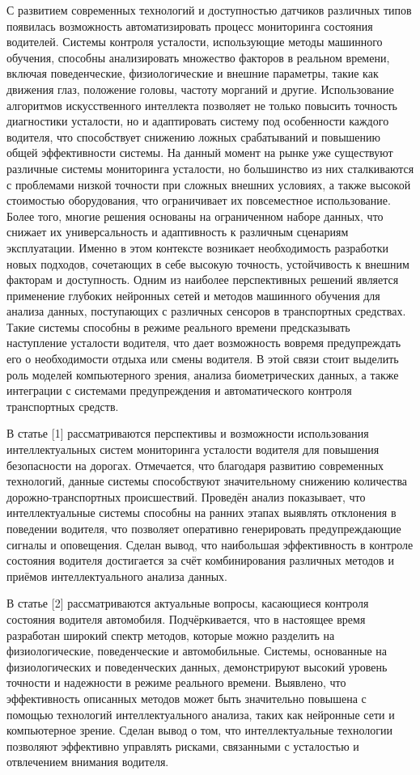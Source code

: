 \documentclass[
]{article}
\begin{document}
С развитием современных технологий и доступностью датчиков различных
типов появилась возможность автоматизировать процесс мониторинга
состояния водителей. Системы контроля усталости, использующие методы
машинного обучения, способны анализировать множество факторов в реальном
времени, включая поведенческие, физиологические и внешние параметры,
такие как движения глаз, положение головы, частоту морганий и другие.
Использование алгоритмов искусственного интеллекта позволяет не только
повысить точность диагностики усталости, но и адаптировать систему под
особенности каждого водителя, что способствует снижению ложных
срабатываний и повышению общей эффективности системы. На данный момент
на рынке уже существуют различные системы мониторинга усталости, но
большинство из них сталкиваются с проблемами низкой точности при сложных
внешних условиях, а также высокой стоимостью оборудования, что
ограничивает их повсеместное использование. Более того, многие решения
основаны на ограниченном наборе данных, что снижает их универсальность и
адаптивность к различным сценариям эксплуатации. Именно в этом контексте
возникает необходимость разработки новых подходов, сочетающих в себе
высокую точность, устойчивость к внешним факторам и доступность. Одним
из наиболее перспективных решений является применение глубоких нейронных
сетей и методов машинного обучения для анализа данных, поступающих с
различных сенсоров в транспортных средствах. Такие системы способны в
режиме реального времени предсказывать наступление усталости водителя,
что дает возможность вовремя предупреждать его о необходимости отдыха
или смены водителя. В этой связи стоит выделить роль моделей
компьютерного зрения, анализа биометрических данных, а также интеграции
с системами предупреждения и автоматического контроля транспортных
средств.

В статье {[}1{]} рассматриваются перспективы и возможности использования
интеллектуальных систем мониторинга усталости водителя для повышения
безопасности на дорогах. Отмечается, что благодаря развитию современных
технологий, данные системы способствуют значительному снижению
количества дорожно-транспортных происшествий. Проведён анализ
показывает, что интеллектуальные системы способны на ранних этапах
выявлять отклонения в поведении водителя, что позволяет оперативно
генерировать предупреждающие сигналы и оповещения. Сделан вывод, что
наибольшая эффективность в контроле состояния водителя достигается за
счёт комбинирования различных методов и приёмов интеллектуального
анализа данных.

В статье {[}2{]} рассматриваются актуальные вопросы, касающиеся контроля
состояния водителя автомобиля. Подчёркивается, что в настоящее время
разработан широкий спектр методов, которые можно разделить на
физиологические, поведенческие и автомобильные. Системы, основанные на
физиологических и поведенческих данных, демонстрируют высокий уровень
точности и надежности в режиме реального времени. Выявлено, что
эффективность описанных методов может быть значительно повышена с
помощью технологий интеллектуального анализа, таких как нейронные сети и
компьютерное зрение. Сделан вывод о том, что интеллектуальные технологии
позволяют эффективно управлять рисками, связанными с усталостью и
отвлечением внимания водителя.
\end{document}
